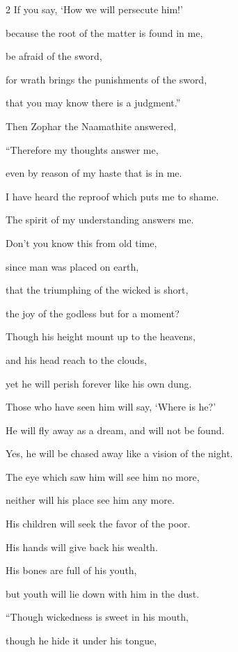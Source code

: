 \begin{multicols}{2}
	\myverse{}If you say, ‘How we will persecute him!’
	
	because the root of the matter is found in me,
	
	\myverse{}be afraid of the sword,
	
	for wrath brings the punishments of the sword,
	
	that you may know there is a judgment.”
	
	
	\mychapter{} \myverse*{}Then Zophar the Naamathite answered,
	
	\quad\quad \myverse{}“Therefore my thoughts answer me,
	
	even by reason of my haste that is in me.
	
	\myverse{}I have heard the reproof which puts me to shame.
	
	The spirit of my understanding answers me.
	
	\myverse{}Don’t you know this from old time,
	
	since man was placed on earth,
	
	\myverse{}that the triumphing of the wicked is short,
	
	the joy of the godless but for a moment?
	
	\myverse{}Though his height mount up to the heavens,
	
	and his head reach to the clouds,
	
	\myverse{}yet he will perish forever like his own dung.
	
	Those who have seen him will say, ‘Where is he?’
	
	\myverse{}He will fly away as a dream, and will not be found.
	
	Yes, he will be chased away like a vision of the night.
	
	\myverse{}The eye which saw him will see him no more,
	
	neither will his place see him any more.
	
	\myverse{}His children will seek the favor of the poor.
	
	His hands will give back his wealth.
	
	\myverse{}His bones are full of his youth,
	
	but youth will lie down with him in the dust.
	
	\vspace{\baselineskip}
	
	\myverse{}“Though wickedness is sweet in his mouth,
	
	though he hide it under his tongue,
	

\end{multicols}
